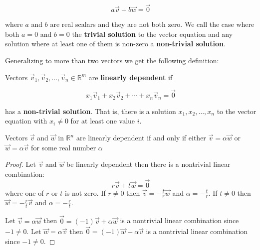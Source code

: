 \begin{equation*}
a\vec{v}+b\vec{w}=\vec{0}
\end{equation*}

where $a$ and $b$ are real scalars and they are not both zero. We call the case where both $a=0$ and $b=0$ the \textbf{trivial solution} to the vector equation and any solution where at least one of them is non-zero a \textbf{non-trivial solution}.

Generalizing to more than two vectors we get the following definition:

\begin{definition}
Vectors $\vec{v}_1, \vec{v}_2, \ldots, \vec{v}_n \in \mathbb{R}^m$ are \textbf{linearly dependent} if 

$$x_1\vec{v}_1+x_2\vec{v}_2+\cdots + x_n \vec{v}_n=\vec{0}$$

has a \textbf{non-trivial solution}. That is, there is a solution $x_1, x_2, \ldots, x_n$ to the vector equation with $x_i \neq 0$ for at least one value $i$. 
\end{definition}
\begin{proposition} Vectors $\vec{v}$ and $\vec{w}$ in $\mathbb{R}^n$ are linearly dependent if and only if either $\vec{v}=\alpha \vec{w}$ or $\vec{w}=\alpha\vec{v}$ for some real number $\alpha$
\end{proposition}
\begin{proof}
Let $\vec{v}$ and $\vec{w}$ be linearly dependent then there is a nontrivial linear combination:
\[
r\vec{v}+t\vec{w}=\vec{0}
\]
where one of $r$ or $t$ is not zero. If $r \neq 0$ then $\vec{v}=-\frac{t}{r}\vec{w}$ and $\alpha=-\frac{t}{r}$. If $t \neq 0$ then $\vec{w}=-\frac{r}{t}\vec{v}$ and $\alpha=-\frac{r}{t}$.

Let $\vec{v}=\alpha \vec{w}$ then $\vec{0}=(-1)\vec{v}+\alpha\vec{w}$ is a nontrivial linear combination since $-1 \neq 0$. 
%
Let $\vec{w}=\alpha\vec{v}$ then $\vec{0}=(-1)\vec{w}+\alpha\vec{v}$ is a nontrivial linear combination since $-1 \neq 0$. 
\end{proof}

